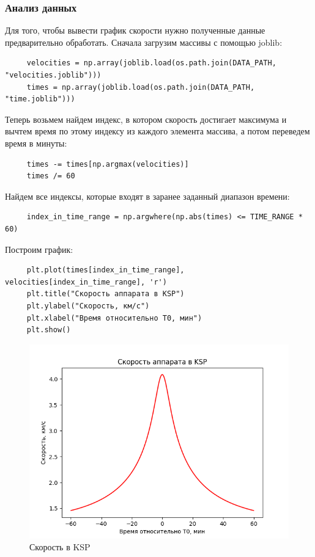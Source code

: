 \documentclass{article}
\begin{document}
     \subsubsection{Анализ данных}
     Для того, чтобы вывести график скорости нужно полученные данные предварительно обработать. Сначала загрузим массивы с помощью joblib:
     \begin{verbatim}
     velocities = np.array(joblib.load(os.path.join(DATA_PATH, "velocities.joblib")))
     times = np.array(joblib.load(os.path.join(DATA_PATH, "time.joblib")))
     \end{verbatim}
     Теперь возьмем найдем индекс, в котором скорость достигает максимума и вычтем время по этому индексу из каждого элемента массива, а потом переведем время в минуты:
     \begin{verbatim}
     times -= times[np.argmax(velocities)]
     times /= 60
     \end{verbatim}
     Найдем все индексы, которые входят в заранее заданный диапазон времени:
     \begin{verbatim}
     index_in_time_range = np.argwhere(np.abs(times) <= TIME_RANGE * 60)
     \end{verbatim}
     Построим график:
     \begin{verbatim}
     plt.plot(times[index_in_time_range], velocities[index_in_time_range], 'r')
     plt.title("Скорость аппарата в KSP")
     plt.ylabel("Скорость, км/с")
     plt.xlabel("Время относительно T0, мин")
     plt.show()
     \end{verbatim}
     \begin{figure}[H]
         \centering
         \includegraphics[width=0.5\linewidth]{images/ksp_speed.png}
         \caption{Скорость в KSP}
     \end{figure}
\end{document}
